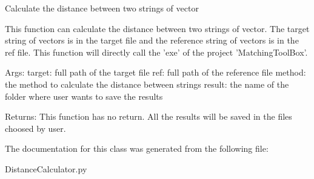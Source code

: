 \begin{DoxyVerb}Calculate the distance between two strings of vector

This function can calculate the distance between two strings of vector. The
target string of vectors is in the target file and the reference string of
vectors is in the ref file. This function will directly call the 'exe' of
the project 'MatchingToolBox'.

Args:
    target: full path of the target file
    ref: full path of the reference file
    method: the method to calculate the distance between strings
    result: the name of the folder where user wants to save the results

Returns:
    This function has no return. All the results will be saved in the files
    choosed by user.
\end{DoxyVerb}
 

The documentation for this class was generated from the following file\+:\begin{DoxyCompactItemize}
\item 
Distance\+Calculator.\+py\end{DoxyCompactItemize}

